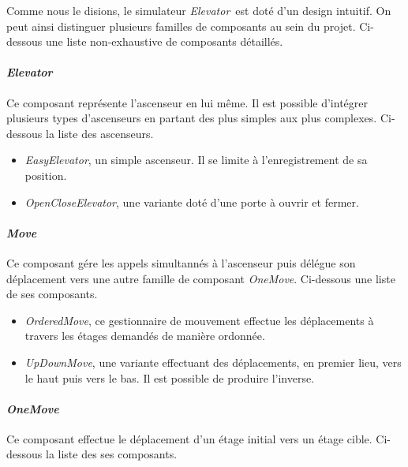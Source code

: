 \documentclass[twocolumn,oneside,10pt]{article}
\newcommand {\elevator}   {{\em Elevator}}
\begin{document}
Comme nous le disions, le simulateur \elevator\ est doté d'un design intuitif. On peut ainsi distinguer plusieurs familles de composants au sein du projet. Ci-dessous une liste non-exhaustive de composants détaillés.

\paragraph{\em Elevator}

Ce composant représente l'ascenseur en lui même. Il est possible d'intégrer plusieurs types d'ascenseurs en partant des plus simples aux plus complexes. Ci-dessous la liste des ascenseurs.\\

\begin{itemize}
\item {\em EasyElevator}, un simple ascenseur. Il se limite à l'enregistrement de sa position.\\
\item {\em OpenCloseElevator}, une variante doté d'une porte à ouvrir et fermer.
\end{itemize}

\paragraph{\em Move}

Ce composant gére les appels simultannés à l'ascenseur puis délégue son déplacement vers une autre famille de composant {\em OneMove}. Ci-dessous une liste de ses composants.\\

\begin{itemize}
\item {\em OrderedMove}, ce gestionnaire de mouvement effectue les déplacements à travers les étages demandés de manière ordonnée.\\
\item {\em UpDownMove}, une variante effectuant des déplacements, en premier lieu, vers le haut puis vers le bas. Il est possible de produire l'inverse.
\end{itemize}

\paragraph{\em OneMove}

Ce composant effectue le déplacement d'un étage initial vers un étage cible. Ci-dessous la liste des ses composants.\\
\end{document}
